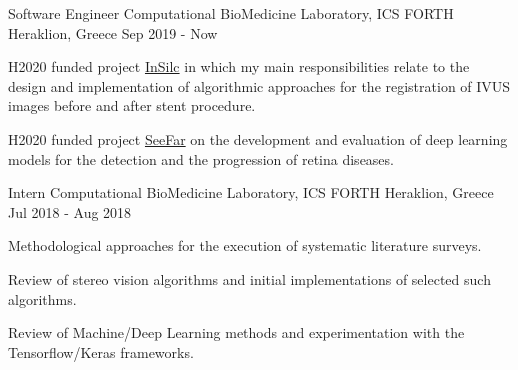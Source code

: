 

\begin{cventries}

  \cventry
    {Software Engineer} %
    {Computational BioMedicine Laboratory, ICS FORTH} %
    {Heraklion, Greece} %
    {Sep 2019 - Now} %
    {
      \begin{cvitems} %
        \item {H2020 funded project \href{https://insilc.eu/}{InSilc} in which my main responsibilities relate to the design and implementation of algorithmic approaches for the registration of IVUS images before and after stent procedure.}
        \item {H2020 funded project \href{https://www.see-far.eu/}{SeeFar}  on the development and evaluation of deep learning models for the detection and the progression of retina diseases.}
      \end{cvitems}
    }

  \cventry
    {Intern} %
    {Computational BioMedicine Laboratory, ICS FORTH} %
    {Heraklion, Greece} %
    {Jul 2018 - Aug 2018} %
    {
      \begin{cvitems} %
        \item {Methodological approaches for the execution of systematic literature surveys.}
        \item {Review of stereo vision algorithms and initial implementations of selected such algorithms.}
        \item {Review of Machine/Deep Learning methods and experimentation with the Tensorflow/Keras frameworks.}
      \end{cvitems}
    }

\end{cventries}
